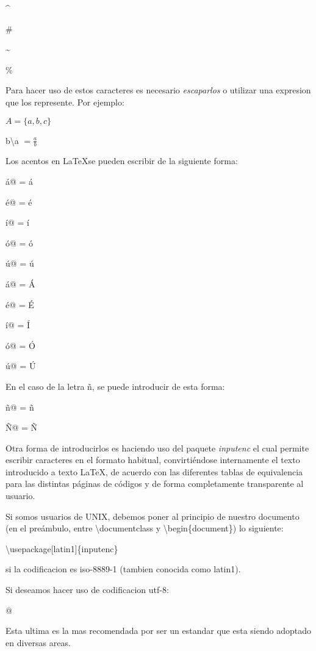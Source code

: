 \documentclass[letterpaper,11pt]{article}
\begin{document}
\^{}

\#

\~{}

\%

Para hacer uso de estos caracteres es necesario \textit{escaparlos} o utilizar una expresion que los represente. Por ejemplo:

$A = \{a, b, c\}$

b\textbackslash a $= \frac{a}{b}$



Los acentos en \LaTeX se pueden escribir de la siguiente forma:

\verb@\'a@ = \'a

\verb@\'e@ = \'e

\verb@\'i@ = \'i

\verb@\'o@ = \'o

\verb@\'u@ = \'u

\verb@\'a@ = \'A

\verb@\'e@ = \'E

\verb@\'i@ = \'I

\verb@\'o@ = \'O

\verb@\'u@ = \'U

En el caso de la letra \~n, se puede introducir de esta forma:

\verb@\~n@ = \~n

\verb@\~N@ = \~N

\noindent Otra forma de introducirlos es haciendo uso del paquete \textit{inputenc} el cual 
permite escribir caracteres en el formato habitual, convirtiéndose internamente el texto 
introducido a texto LaTeX, de acuerdo con las diferentes tablas de equivalencia para las 
distintas páginas de códigos y de forma completamente transparente al usuario.

\noindent Si somos usuarios de UNIX, debemos poner al principio de nuestro documento 
(en el preámbulo, entre \textbackslash documentclass y \textbackslash begin\{document\}) lo siguiente:


\textbackslash usepackage[latin1]\{inputenc\}


si la codificacion es iso-8889-1 (tambien conocida como latin1).


Si deseamos hacer uso de codificacion utf-8:

\verb@\usepackage[utf8]{inputenc}@

\noindent Esta ultima es la mas recomendada por ser un estandar que esta siendo adoptado en diversas areas.
\end{document}
